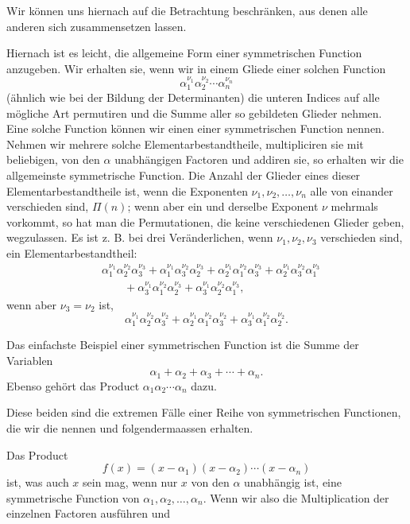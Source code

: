 
Wir können uns hiernach auf die Betrachtung  beschränken, aus denen alle anderen sich zusammensetzen lassen.

Hiernach ist es leicht, die allgemeine Form einer symmetrischen Function anzugeben. Wir erhalten sie, wenn wir in einem Gliede einer solchen Function
\[
 \alpha_1^{\nu_1}\alpha_2^{\nu_2}\cdots\alpha_n^{\nu_n}
\]
(ähnlich wie bei der Bildung der Determinanten) die unteren Indices auf alle mögliche Art permutiren und die Summe aller so gebildeten Glieder nehmen. Eine solche Function können wir einen  einer symmetrischen Function nennen. Nehmen wir mehrere solche Elementarbestandtheile, multipliciren sie mit beliebigen, von den $\alpha$ unabhängigen Factoren und addiren sie, so erhalten wir die allgemeinste symmetrische Function. Die Anzahl der Glieder eines dieser Elementarbestandtheile ist, wenn die Exponenten $\nu_1,\nu_2,\ldots,\nu_n$ alle von einander verschieden sind, $\Pi(n)$; wenn aber ein und derselbe Exponent $\nu$ mehrmals vorkommt, so hat man die Permutationen, die keine verschiedenen Glieder geben, wegzulassen. Es ist z. B. bei drei Veränderlichen, wenn $\nu_1,\nu_2,\nu_3$ verschieden sind, ein Elementarbestandtheil:
\[
\begin{aligned}
 &\alpha_1^{\nu_1}\alpha_2^{\nu_2}\alpha_3^{\nu_3}
+\alpha_1^{\nu_1}\alpha_3^{\nu_2}\alpha_2^{\nu_3}
+\alpha_2^{\nu_1}\alpha_1^{\nu_2}\alpha_3^{\nu_3}
+\alpha_2^{\nu_1}\alpha_3^{\nu_2}\alpha_1^{\nu_3}\\
 &\qquad+\alpha_3^{\nu_1}\alpha_1^{\nu_2}\alpha_2^{\nu_3}
+\alpha_3^{\nu_1}\alpha_2^{\nu_2}\alpha_1^{\nu_3},
\end{aligned}
\]
wenn aber $\nu_3=\nu_2$ ist,
\[
 \alpha_1^{\nu_1}\alpha_2^{\nu_2}\alpha_3^{\nu_2}
+\alpha_2^{\nu_1}\alpha_1^{\nu_2}\alpha_3^{\nu_2}
+\alpha_3^{\nu_1}\alpha_1^{\nu_2}\alpha_2^{\nu_2}.
\]

Das einfachste Beispiel einer symmetrischen Function ist die Summe der Variablen
\[
 \alpha_1+\alpha_2+\alpha_3+\cdots+\alpha_n.
\]
Ebenso gehört das Product $\alpha_1\alpha_2\cdots\alpha_n$ dazu.

Diese beiden sind die extremen Fälle einer Reihe von symmetrischen Functionen, die wir die  nennen und folgendermaassen erhalten.

Das Product
\begin{equation}
 f(x)=(x-\alpha_1)(x-\alpha_2)\cdots(x-\alpha_n)
\tag{1}
\end{equation}
ist, was auch $x$ sein mag, wenn nur $x$ von den $\alpha$ unabhängig ist, eine symmetrische Function von $\alpha_1,\alpha_2,\ldots,\alpha_n$. Wenn wir also die Multiplication der einzelnen Factoren ausführen und
